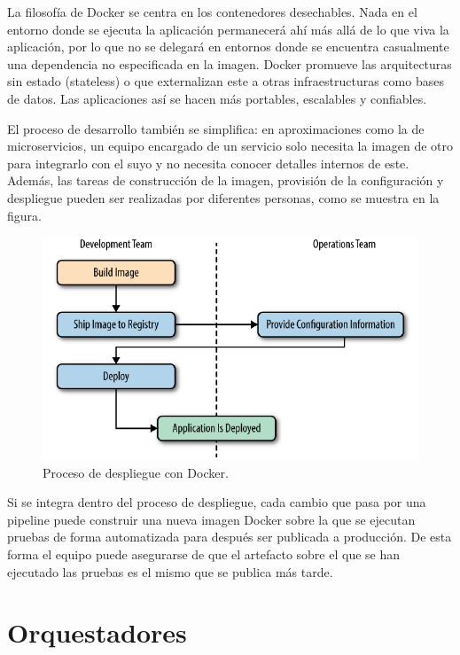 \documentclass[11pt,spanish,listoffigures]{tfgetsinf}
\begin{document}
La filosofía de Docker se centra en los contenedores desechables. Nada en el entorno donde se ejecuta la aplicación permanecerá ahí más allá de lo que viva la aplicación, por lo que no se delegará en entornos donde se encuentra casualmente una dependencia no especificada en la imagen. Docker promueve las arquitecturas sin estado (stateless) o que externalizan este a otras infraestructuras como bases de datos. Las aplicaciones así se hacen más portables, escalables y confiables. \cite{Matthias}

El proceso de desarrollo también se simplifica: en aproximaciones como la de microservicios, un equipo encargado de un servicio solo necesita la imagen de otro para integrarlo con el suyo y no necesita conocer detalles internos de este. Además, las tareas de construcción de la imagen, provisión de la configuración y despliegue pueden ser realizadas por diferentes personas, como se muestra en la figura. 

\begin{figure}[h]
\centering
\includegraphics[scale=0.7]{docker_process}
\caption{Proceso de despliegue con Docker. \cite{Matthias}}
\end{figure}


Si se integra dentro del proceso de despliegue, cada cambio que pasa por una pipeline puede construir una nueva imagen Docker sobre la que se ejecutan pruebas de forma automatizada para después ser publicada a producción. De esta forma el equipo puede asegurarse de que el artefacto sobre el que se han ejecutado las pruebas es el mismo que se publica más tarde. 

\section{Orquestadores}
\end{document}
